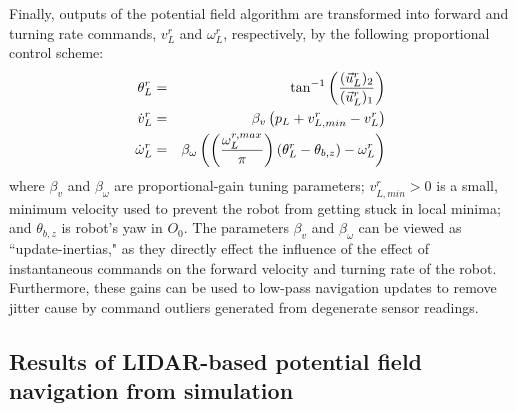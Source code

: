 			Finally, outputs of the potential field algorithm are transformed into forward and turning rate commands, ${v}_{L}^{r}$ and $\omega_{L}^{r}$, respectively, by the following proportional control scheme:
				\begin{eqnarray}
					\theta_{L}^{r} 			&=& \tan^{-1}\left( \frac{(\vec{u}^{r}_{L})_{2} }{(\vec{u}^{r}_{L})_{1}} \right) \nonumber\\
					\dot{v}_{L}^{r} 		&=& \beta_{v} \left( p_{L} + v_{L,min}^{r} - v_{L}^{r} \right) \nonumber \\
					\dot{\omega}_{L}^{r} 	&=& \beta_{\omega} \left( \left( \frac{ \omega_{L}^{r,max} }{\pi} \right) \left(  \theta_{L}^{r} - \theta_{b,z} \right) - \omega_{L}^{r} \right)
				\end{eqnarray}
			where $\beta_{v}$ and $\beta_{\omega}$ are proportional-gain tuning parameters; $v_{L,min}^{r}>0$ is a small, minimum velocity used to prevent the robot from getting stuck in local minima; and $\theta_{b,z}$ is robot's yaw in $O_{0}$. The parameters $\beta_{v}$ and $\beta_{\omega}$ can be viewed as ``update-inertias," as they directly effect the influence of the effect of instantaneous commands on the forward velocity and turning rate of the robot. Furthermore, these gains can be used to low-pass navigation updates to remove jitter cause by command outliers generated from degenerate sensor readings.


		\subsection{Results of LIDAR-based potential field navigation from simulation}

